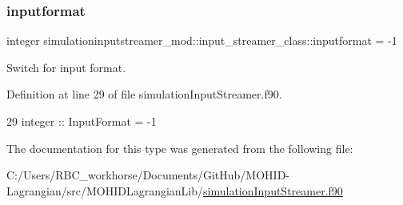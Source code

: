 \subsubsection{\texorpdfstring{inputformat}{inputformat}}
{\footnotesize\ttfamily integer simulationinputstreamer\+\_\+mod\+::input\+\_\+streamer\+\_\+class\+::inputformat = -\/1\hspace{0.3cm}{\ttfamily [private]}}



Switch for input format. 



Definition at line 29 of file simulation\+Input\+Streamer.\+f90.


\begin{DoxyCode}
29         \textcolor{keywordtype}{integer} :: InputFormat = -1
\end{DoxyCode}


The documentation for this type was generated from the following file\+:\begin{DoxyCompactItemize}
\item 
C\+:/\+Users/\+R\+B\+C\+\_\+workhorse/\+Documents/\+Git\+Hub/\+M\+O\+H\+I\+D-\/\+Lagrangian/src/\+M\+O\+H\+I\+D\+Lagrangian\+Lib/\mbox{\hyperlink{simulation_input_streamer_8f90}{simulation\+Input\+Streamer.\+f90}}\end{DoxyCompactItemize}
